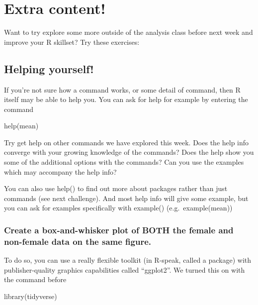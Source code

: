 \documentclass[
]{book}
\newenvironment{Shaded}{\begin{snugshade}}{\end{snugshade}}
\newcommand{\FunctionTok}[1]{\textcolor[rgb]{0.00,0.00,0.00}{#1}}
\newcommand{\NormalTok}[1]{#1}
\begin{document}
\hypertarget{extra-content-1}{%
\section{Extra content!}\label{extra-content-1}}

Want to try explore some more outside of the analysis class before next week and improve your R skillset? Try these exercises:

\hypertarget{helping-yourself}{%
\subsection{Helping yourself!}\label{helping-yourself}}

If you're not sure how a command works, or some detail of command, then R itself may be able to help you. You can ask for help for example by entering the command

help(mean)

Try get help on other commands we have explored this week. Does the help info converge with your growing knowledge of the commands? Does the help show you some of the additional options with the commands? Can you use the examples which may accompany the help info?

You can also use help() to find out more about packages rather than just commands (see next challenge). And most help info will give some example, but you can ask for examples specifically with example() (e.g.~example(mean))

\hypertarget{create-a-box-and-whisker-plot-of-both-the-female-and-non-female-data-on-the-same-figure.}{%
\subsubsection{Create a box-and-whisker plot of BOTH the female and non-female data on the same figure.}\label{create-a-box-and-whisker-plot-of-both-the-female-and-non-female-data-on-the-same-figure.}}

To do so, you can use a really flexible toolkit (in R-speak, called a package) with publisher-quality graphics capabilities called ``ggplot2''. We turned this on with the command before

\begin{Shaded}
\begin{Highlighting}[]
\FunctionTok{library}\NormalTok{(tidyverse)}
\end{Highlighting}
\end{Shaded}
\end{document}
